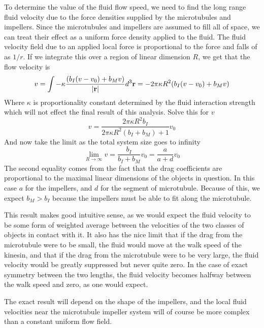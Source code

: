 \documentclass[11pt]{ucthesis}
\def\br{{\bf r}}
\begin{document}
To determine the value of the fluid flow speed, we need to find the long range fluid velocity due to the force densities supplied by the microtubules and impellers.
Since the microtubules and impellers are assumed to fill all of space, we can treat their effect as a uniform force density applied to the fluid.
The fluid velocity field due to an applied local force is proportional to the force and falls of as $1/r$. If we integrate this over a region of linear dimension $R$, we get that the flow velocity is
\begin{equation}
\label{eq:mfflow}
v = \int -\kappa \frac{(b_I (v - v_0) + b_M v)}{|\br|} d^3\br = -2\pi \kappa R^2 (b_I (v - v_0) + b_M v)
\end{equation}
Where $\kappa$ is proportionality constant determined by the fluid interaction strength which will not effect the final result of this analysis.
Solve this for $v$
\begin{equation}
\label{eq:mfflowsol}
v = \frac{2\pi \kappa R^2 b_I}{2\pi \kappa R^2(b_I + b_M) + 1} v_0
\end{equation}
And now take the limit as the total system size goes to infinity
\begin{equation}
\label{eq:mfflowlimit}
\lim_{R\to\infty} v = \frac{b_I}{b_I + b_M} v_0 = \frac{a}{a+d} v_0
\end{equation}
The second equality comes from the fact that the drag coefficients are proportional to the maximal linear dimensions of the objects in question. 
In this case $a$ for the impellers, and $d$ for the segment of microtubule. 
Because of this, we expect $b_M > b_I$ because the impellers must be able to fit along the microtubule.

This result makes good intuitive sense, as we would expect the fluid velocity to be some form of weighted average between the velocities of the two classes of objects in contact with it. 
It also has the nice limit that if the drag from the microtubule were to be small, the fluid would move at the walk speed of the kinesin, and that if the drag from the microtubule were to be very large, the fluid velocity would be greatly suppressed but never quite zero.
In the case of exact symmetry between the two lengths, the fluid velocity becomes halfway between the walk speed and zero, as one would expect.

The exact result will depend on the shape of the impellers, and the local fluid velocities near the microtubule impeller system will of course be more complex than a constant uniform flow field.
\end{document}
